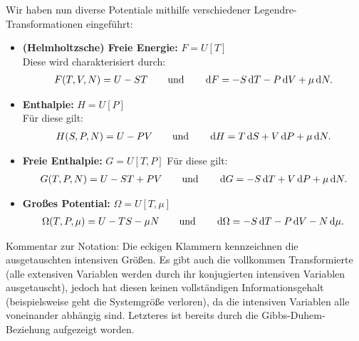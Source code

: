 \begin{summary}
        Wir haben nun diverse Potentiale mithilfe verschiedener Legendre-Transformationen eingeführt:
        \begin{itemize}
            \item \textbf{(Helmholtzsche) Freie Energie:} $F=U[T]$ \\
            Diese wird charakterisiert durch:
            \begin{align*}
                F(T,V,N)=U-ST \qquad \mathrm{und} \qquad \mathop{}\!\mathrm{d} F=-S\mathop{}\!\mathrm{d} T-P\mathop{}\!\mathrm{d} V+\mu \mathop{}\!\mathrm{d} N.
            \end{align*}
            \item \textbf{Enthalpie:} $H=U[P]$ \\
            Für diese gilt:
            \begin{align*}
                H(S,P,N)=U-PV \qquad \mathrm{und} \qquad \mathop{}\!\mathrm{d} H=T\mathop{}\!\mathrm{d} S+V\mathop{}\!\mathrm{d} P+\mu \mathop{}\!\mathrm{d} N.
            \end{align*}
            \item \textbf{Freie Enthalpie:} $G=U[T,P]$
            Für diese gilt:
            \begin{align*}
                G(T,P,N)=U-ST+PV \qquad \mathrm{und} \qquad \mathop{}\!\mathrm{d} G=-S\mathop{}\!\mathrm{d} T+V\mathop{}\!\mathrm{d} P+\mu \mathop{}\!\mathrm{d} N.
            \end{align*}
            \item \textbf{Großes Potential:} $\Omega=U[T,\mu]$
            \begin{align*}
                \Omega (T,P,\mu)=U-TS-\mu N \qquad \mathrm{und} \qquad \mathop{}\!\mathrm{d} \Omega=-S\mathop{}\!\mathrm{d} T-P\mathop{}\!\mathrm{d} V-N \mathop{}\!\mathrm{d} \mu.
            \end{align*}
        \end{itemize}
        Kommentar zur Notation: Die eckigen Klammern kennzeichnen die ausgetauschten intensiven Größen.
        Es gibt auch die vollkommen Transformierte (alle extensiven Variablen werden durch ihr konjugierten intensiven Variablen ausgetauscht), jedoch hat diesen keinen vollständigen Informationsgehalt (beispielsweise geht die Systemgröße verloren), da die intensiven Variablen alle voneinander abhängig sind. Letzteres ist bereits durch die Gibbs-Duhem-Beziehung aufgezeigt worden. 
    \end{summary}
